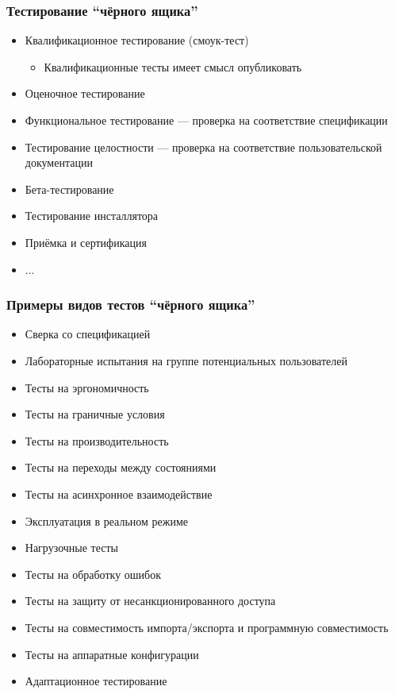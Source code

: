 \documentclass[xetex,mathserif,serif]{beamer}
\begin{document}
	\begin{frame}
		\frametitle{Тестирование ``чёрного ящика''}
		\begin{itemize}
			\item Квалификационное тестирование (смоук-тест)
			\begin{itemize}
				\item Квалификационные тесты имеет смысл опубликовать
			\end{itemize}
			\item Оценочное тестирование
			\item Функциональное тестирование --- проверка на соответствие спецификации
			\item Тестирование целостности --- проверка на соответствие пользовательской документации
			\item Бета-тестирование
			\item Тестирование инсталлятора
			\item Приёмка и сертификация
			\item ...
		\end{itemize}
	\end{frame}

	\begin{frame}
		\frametitle{Примеры видов тестов ``чёрного ящика''}
		\begin{itemize}
			\item Сверка со спецификацией
			\item Лабораторные испытания на группе потенциальных пользователей
			\item Тесты на эргономичность
			\item Тесты на граничные условия
			\item Тесты на производительность
			\item Тесты на переходы между состояниями
			\item Тесты на асинхронное взаимодействие
			\item Эксплуатация в реальном режиме
			\item Нагрузочные тесты
			\item Тесты на обработку ошибок
			\item Тесты на защиту от несанкционированного доступа
			\item Тесты на совместимость импорта/экспорта и программную совместимость
			\item Тесты на аппаратные конфигурации
			\item Адаптационное тестирование
		\end{itemize}
	\end{frame}
\end{document}
